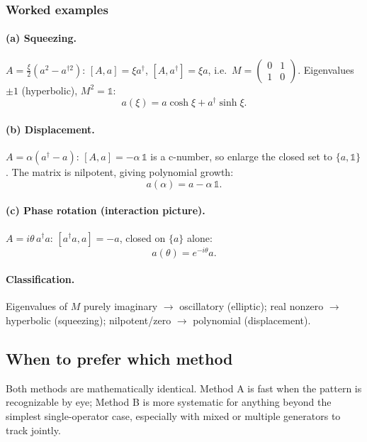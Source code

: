\documentclass[../main.tex]{subfiles}
\begin{document}
\subsubsection*{Worked examples}

\paragraph{(a) Squeezing.} $A=\tfrac{\xi}{2}(a^2-a^{\dagger2})$: $[A,a]=\xi a^\dagger$,
$[A,a^\dagger]=\xi a$, i.e.\ $M=\begin{pmatrix}0&1\\1&0\end{pmatrix}$. Eigenvalues
$\pm1$ (hyperbolic), $M^2=\mathbb1$:
\begin{equation}
a(\xi)=a\cosh\xi+a^\dagger\sinh\xi.
\end{equation}

\paragraph{(b) Displacement.} $A=\alpha(a^\dagger-a)$: $[A,a]=-\alpha\,\mathbb 1$ is a
c-number, so enlarge the closed set to $\{a,\mathbb1\}$. The matrix is nilpotent,
giving polynomial growth:
\begin{equation}
a(\alpha)=a-\alpha\,\mathbb 1.
\end{equation}

\paragraph{(c) Phase rotation (interaction picture).} $A=i\theta\,a^\dagger a$:
$[a^\dagger a,a]=-a$, closed on $\{a\}$ alone:
\begin{equation}
a(\theta)=e^{-i\theta}a.
\end{equation}

\paragraph{Classification.} Eigenvalues of $M$ purely imaginary $\to$ oscillatory
(elliptic); real nonzero $\to$ hyperbolic (squeezing); nilpotent/zero $\to$ polynomial
(displacement).

\subsection{When to prefer which method}
Both methods are mathematically identical. Method A is fast when the pattern is
recognizable by eye; Method B is more systematic for anything beyond the simplest
single-operator case, especially with mixed or multiple generators to track jointly.
\end{document}
